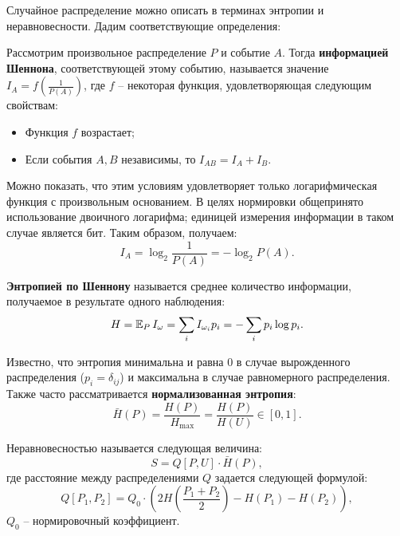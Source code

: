 Случайное распределение можно описать в терминах энтропии и неравновесности. Дадим соответствующие определения:
\begin{definition}
    Рассмотрим произвольное распределение $P$ и событие $A$. Тогда \textbf{информацией Шеннона}, соответствующей этому событию, называется значение $I_A = f\left( \frac{1}{P(A)} \right)$, где $f$ -- некоторая функция, удовлетворяющая следующим свойствам:
    \begin{itemize}
    \item
        Функция $f$ возрастает;
    \item
        Если события $A, B$ независимы, то $I_{AB} = I_{A} + I_{B}$.
    \end{itemize}
    
    Можно показать, что этим условиям удовлетворяет только логарифмическая функция с произвольным основанием. В целях нормировки общепринято использование двоичного логарифма; единицей измерения информации в таком случае является бит. Таким образом, получаем:
    \begin{equation*}
        I_A = \log_2 \frac{1}{P(A)} = -\log_2 P(A).
    \end{equation*}
\end{definition}

\begin{definition}
    \textbf{Энтропией по Шеннону} называется среднее количество информации, получаемое в результате одного наблюдения:
    \begin{equation*}
        H = \operatorname{\mathbb{E}}_{P} I_{\omega} = \sum_{i} I_{\omega_i} p_i = -\sum_i p_i \log p_i.
    \end{equation*}
    
    Известно, что энтропия минимальна и равна 0 в случае вырожденного распределения ($p_i = \delta_{ij}$) и максимальна в случае равномерного распределения. Также часто рассматривается \textbf{нормализованная энтропия}:
    \begin{equation*}
        \bar{H}(P) = \frac{H(P)}{H_{\text{max}}} = \frac{H(P)}{H(U)} \in \left[ 0, 1 \right].
    \end{equation*}
\end{definition}

\begin{definition}
    Неравновесностью называется следующая величина:
    \begin{equation*}
        S = Q\left[ P, U \right] \cdot \bar{H}\left( P \right),
    \end{equation*}
    где расстояние между распределениями $Q$ задается следующей формулой:
    \begin{equation*}
        Q\left[ P_1, P_2 \right] = Q_0 \cdot \left( 2H\left( \frac{P_1 + P_2}{2} \right) - H(P_1) - H(P_2) \right),
    \end{equation*}
    $Q_0$ -- нормировочный коэффициент.
\end{definition}

